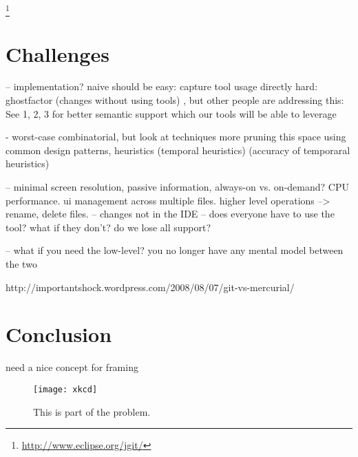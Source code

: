\documentclass[conference]{IEEEtran}
\begin{document}
\footnote{\url{http://www.eclipse.org/jgit/}}

\section{Challenges}

-- implementation?
naive should be easy: capture tool usage directly  
hard: ghostfactor (changes without using tools) , but other people
 are addressing this: See 1, 2, 3 for better semantic support which our tools will be able to leverage
 
 - worst-case combinatorial, but look at techniques more pruning this space using common design patterns, heuristics (temporal heuristics) (accuracy of temporaral heuristics)
 
 -- minimal screen resolution, passive information, always-on vs. on-demand? CPU performance. ui management across multiple files. higher level operations --> rename, delete files.
 -- changes not in the IDE
 -- does everyone have to use the tool? what if they don't? do we lose all support?

 -- what if you need the low-level? you no longer have any mental model between the two
 
 http://importantshock.wordpress.com/2008/08/07/git-vs-mercurial/


\section{Conclusion}


need a nice concept for framing

\begin{figure}[!t]
\centering
\texttt{[image: xkcd]}
\caption{This is part of the problem.}
\label{fig:xkcd}
\end{figure}

%
\end{document}
